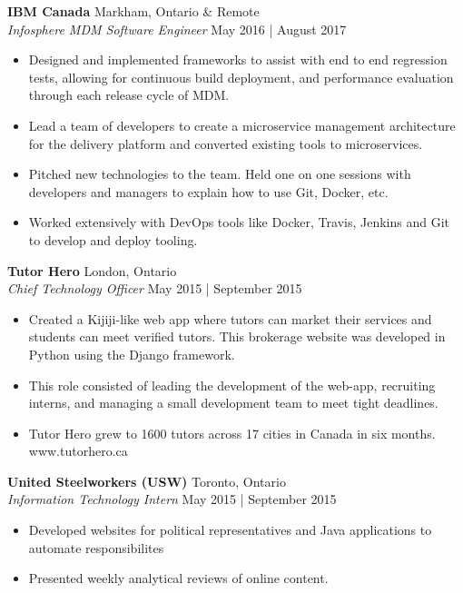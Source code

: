 \documentclass[a4paper]{article}
\begin{document}
\textbf{IBM Canada} \hfill Markham, Ontario \& Remote\\
\textit{Infosphere MDM Software Engineer} \hfill May 2016 | August 2017\\
\vspace{-1mm}
\begin{itemize} \itemsep 1pt
	\item Designed and implemented frameworks to assist with end to end regression tests, allowing for continuous build deployment, and performance evaluation through each release cycle of MDM.
	\item Lead a team of developers to create a microservice management architecture for the delivery platform and converted existing tools to microservices.
	\item Pitched new technologies to the team. Held one on one sessions with developers and managers to explain how to use Git, Docker, etc.
	\item Worked extensively with DevOps tools like Docker, Travis, Jenkins and Git to develop and deploy tooling.
\end{itemize}

\textbf{Tutor Hero} \hfill London, Ontario\\
\textit{Chief Technology Officer} \hfill May 2015 | September 2015\\
\vspace{-1mm}
\begin{itemize} \itemsep 1pt
	\item Created a Kijiji-like web app where tutors can market their services and students can meet verified tutors. This brokerage website was developed in Python using the Django framework.  
	\item This role consisted of leading the development of the web-app, recruiting interns, and managing a small development team to meet tight deadlines. 
	\item Tutor Hero grew to 1600 tutors across 17 cities in Canada in six months. www.tutorhero.ca
\end{itemize}

\textbf{United Steelworkers (USW)} \hfill Toronto, Ontario\\
\textit{Information Technology Intern} \hfill May 2015 | September 2015\\
\vspace{-1mm}
\begin{itemize} \itemsep 1pt
	\item Developed websites for political representatives and Java applications to automate responsibilites
	\item Presented weekly analytical reviews of online content.
\end{itemize}
\end{document}
